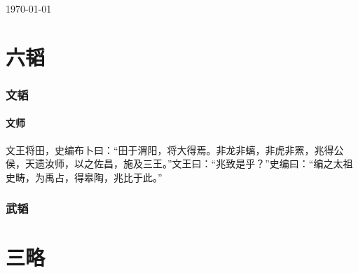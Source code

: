 \documentclass[11pt]{ctexart}
\begin{document}


\today
\tableofcontents

\part{六韬}
\section{文韬}
\subsection{文师}
文王将田，史编布卜曰：“田于渭阳，将大得焉。非龙非螭，非虎非罴，兆得公侯，天遗汝师，以之佐昌，施及三王。”文王曰：“兆致是乎？”史编曰：“编之太祖史畴，为禹占，得皋陶，兆比于此。” 

\section{武韬}

\part{三略}
\end{document}

